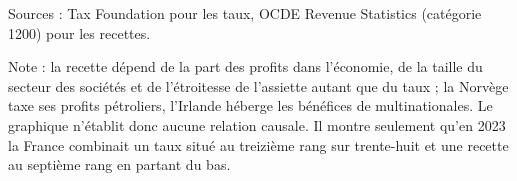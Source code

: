 Sources : Tax Foundation pour les taux, OCDE Revenue Statistics (catégorie 1200) pour les recettes.\par Note : la recette dépend de la part des profits dans l'économie, de la taille du secteur des sociétés et de l'étroitesse de l'assiette autant que du taux ; la Norvège taxe ses profits pétroliers, l'Irlande héberge les bénéfices de multinationales. Le graphique n'établit donc aucune relation causale. Il montre seulement qu'en 2023 la France combinait un taux situé au treizième rang sur trente-huit et une recette au septième rang en partant du bas.
